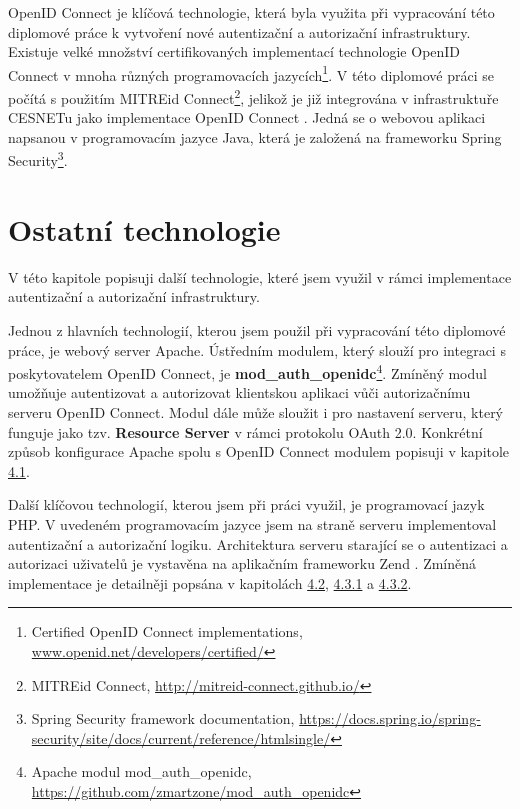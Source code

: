 \documentclass[
  printed, %
  twoside, %
  table,   %
  nolof,     %
  nolot,     %
]{fithesis3}
\begin{document}
\par
OpenID Connect je klíčová technologie, která byla využita při vypracování této diplomové práce k vytvoření nové autentizační a autorizační infrastruktury. Existuje velké množství certifikovaných implementací technologie OpenID Connect v mnoha různých programovacích jazycích\footnote{Certified OpenID Connect implementations, \url{www.openid.net/developers/certified/}}. V této diplomové práci se počítá s použitím MITREid Connect\footnote{MITREid Connect, \url{http://mitreid-connect.github.io/}}, jelikož je již integrována v infrastruktuře CESNETu jako implementace OpenID Connect \cite{oidcPresentation}. Jedná se o webovou aplikaci napsanou v programovacím jazyce Java, která je založená na frameworku Spring Security\footnote{Spring Security framework documentation, \url{https://docs.spring.io/spring-security/site/docs/current/reference/htmlsingle/}}. 

\section{Ostatní technologie}
V této kapitole popisuji další technologie, které jsem využil v rámci implementace autentizační a autorizační infrastruktury. 
\par
Jednou z hlavních technologií, kterou jsem použil při vypracování této diplomové práce, je webový server Apache. Ústředním modulem, který slouží pro integraci s poskytovatelem OpenID Connect, je \textbf{mod\_auth\_openidc}\footnote{Apache modul mod\_auth\_openidc, \url{https://github.com/zmartzone/mod\_auth\_openidc}}. Zmíněný modul umožňuje autentizovat a autorizovat klientskou aplikaci vůči autorizačnímu serveru OpenID Connect. Modul dále může sloužit i pro nastavení serveru, který funguje jako tzv. \textbf{Resource Server} v rámci protokolu OAuth 2.0. Konkrétní způsob konfigurace Apache spolu s OpenID Connect modulem popisuji v kapitole \hyperref[apacheConfig]{4.1}.

\par
Další klíčovou technologií, kterou jsem při práci využil, je programovací jazyk PHP. V uvedeném programovacím jazyce jsem na straně serveru  implementoval autentizační a autorizační logiku. Architektura serveru  starající se o autentizaci a autorizaci uživatelů je vystavěna na aplikačním frameworku Zend \cite{zend}. Zmíněná implementace je detailněji popsána v kapitolách \hyperref[ACImpl]{4.2}, \hyperref[ShongoImpl-authn]{4.3.1} a \hyperref[ShongoImpl-authr]{4.3.2}. 
\end{document}
